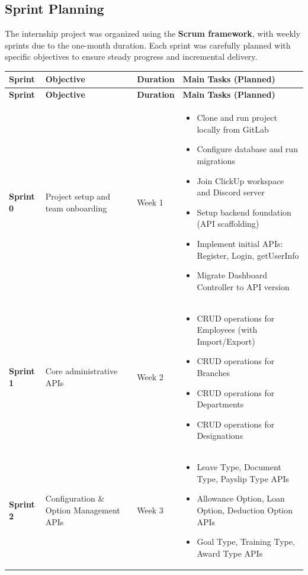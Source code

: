 \subsection{Sprint Planning}
The internship project was organized using the \textbf{Scrum framework}, with weekly sprints due to the one-month duration. Each sprint was carefully planned with specific objectives to ensure steady progress and incremental delivery.

\begin{longtable}{|p{1.5cm}|p{4cm}|p{2.5cm}|p{5.5cm}|}
\hline
\textbf{Sprint} & \textbf{Objective} & \textbf{Duration} & \textbf{Main Tasks (Planned)} \\
\hline
\endfirsthead
\hline
\textbf{Sprint} & \textbf{Objective} & \textbf{Duration} & \textbf{Main Tasks (Planned)} \\
\hline
\endhead
\textbf{Sprint 0} & Project setup and team onboarding & Week 1 & 
\begin{itemize}
    \item Clone and run project locally from GitLab
    \item Configure database and run migrations
    \item Join ClickUp workspace and Discord server
    \item Setup backend foundation (API scaffolding)
    \item Implement initial APIs: Register, Login, getUserInfo
    \item Migrate Dashboard Controller to API version
\end{itemize} \\
\hline
\textbf{Sprint 1} & Core administrative APIs & Week 2 & 
\begin{itemize}
    \item CRUD operations for Employees (with Import/Export)
    \item CRUD operations for Branches
    \item CRUD operations for Departments
    \item CRUD operations for Designations
\end{itemize} \\
\hline
\textbf{Sprint 2} & Configuration \& Option Management APIs & Week 3 & 
\begin{itemize}
    \item Leave Type, Document Type, Payslip Type APIs
    \item Allowance Option, Loan Option, Deduction Option APIs
    \item Goal Type, Training Type, Award Type APIs

\end{itemize}
\end{longtable}
